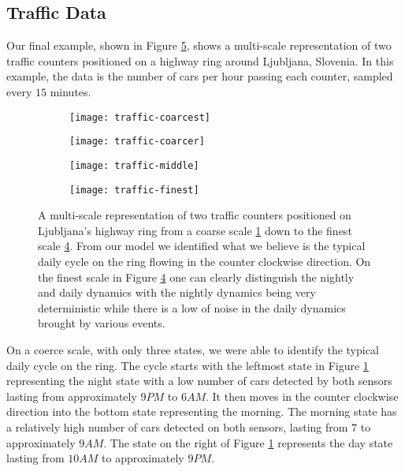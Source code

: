 \subsection{Traffic Data}

Our final example, shown in Figure \ref{fig:example-traffic-multiscale}, shows a multi-scale representation of two traffic counters positioned on a highway ring around Ljubljana, Slovenia. In this example, the data is the number of cars per hour passing each counter, sampled every $15$ minutes.  

\begin{figure}[h!]
  	\centering
  	\begin{subfigure}[b]{.48\columnwidth}
	  	\centering
	  	\texttt{[image: traffic-coarcest]}
  		\caption{\label{fig:traffic-coarcest}}
	\end{subfigure}
  	\begin{subfigure}[b]{.48\columnwidth}
	  	\centering
	  	\texttt{[image: traffic-coarcer]}
  		\caption{\label{fig:traffic-coarcer}}
	\end{subfigure}
	\begin{subfigure}[b]{.48\columnwidth}
	  	\centering
	  	\texttt{[image: traffic-middle]}
  		\caption{\label{fig:traffic-middle}}
	\end{subfigure}
	\begin{subfigure}[b]{.48\columnwidth}
	  	\centering
	  	\texttt{[image: traffic-finest]}
  		\caption{\label{fig:traffic-finest}}
	\end{subfigure}
  	\caption{A multi-scale representation of two traffic counters positioned on Ljubljana's highway ring from a coarse scale \ref{fig:traffic-coarcest} down to the finest scale \ref{fig:traffic-finest}. From our model we identified what we believe is the typical daily cycle on the ring flowing in the counter clockwise direction. On the finest scale in Figure \ref{fig:traffic-finest} one can clearly distinguish the nightly and daily dynamics with the nightly dynamics being very deterministic while there is a low of noise in the daily dynamics brought by various events.}
  	\label{fig:example-traffic-multiscale}
\end{figure}

On a coerce scale, with only three states, we were able to identify the typical daily cycle on the ring. The cycle starts with the leftmost state in Figure \ref{fig:traffic-coarcest} representing the night state with a low number of cars detected by both sensors lasting from approximately $9PM$ to $6AM$. It then moves in the counter clockwise direction into the bottom state representing the morning. The morning state has a relatively high number of cars detected on both sensors, lasting from $7$ to approximately $9AM$. The state on the right of Figure \ref{fig:traffic-coarcest} represents the day state lasting from $10AM$ to approximately $9PM$.

